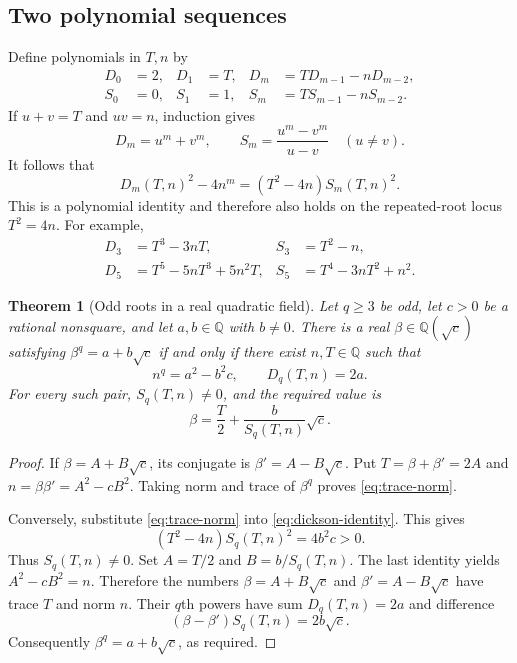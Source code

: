 \documentclass[11pt,letterpaper]{article}
\numberwithin{equation}{section}
\newtheorem{theorem}{Theorem}[section]
\theoremstyle{definition}\newtheorem{definition}[theorem]{Definition}
\theoremstyle{remark}\newtheorem{remark}[theorem]{Remark}
\newcommand{\Q}{\mathbb Q}\newcommand{\C}{\mathbb C}\newcommand{\R}{\mathbb R}\newcommand{\Z}{\mathbb Z}
\begin{document}
\subsection{Two polynomial sequences}
Define polynomials in $T,n$ by
\begin{align}
D_0&=2,&D_1&=T,&D_m&=T D_{m-1}-nD_{m-2},\\
S_0&=0,&S_1&=1,&S_m&=T S_{m-1}-nS_{m-2}.
\end{align}
If $u+v=T$ and $uv=n$, induction gives
\begin{equation}
D_m=u^m+v^m,\qquad
S_m=\frac{u^m-v^m}{u-v}\quad(u\ne v).
\end{equation}
It follows that
\begin{equation}
D_m(T,n)^2-4n^m=(T^2-4n)S_m(T,n)^2.
\label{eq:dickson-identity}
\end{equation}
This is a polynomial identity and therefore also holds on the repeated-root locus $T^2=4n$. For example,
\begin{align}
D_3&=T^3-3nT,&S_3&=T^2-n,\\
D_5&=T^5-5nT^3+5n^2T,&S_5&=T^4-3nT^2+n^2.
\end{align}

\begin{theorem}[Odd roots in a real quadratic field]
\label{thm:odd}
Let $q\ge3$ be odd, let $c>0$ be a rational nonsquare, and let $a,b\in\Q$ with $b\ne0$. There is a real $\beta\in\Q(\sqrt c)$ satisfying $\beta^q=a+b\sqrt c$ if and only if there exist $n,T\in\Q$ such that
\begin{equation}
n^q=a^2-b^2c,\qquad D_q(T,n)=2a.
\label{eq:trace-norm}
\end{equation}
For every such pair, $S_q(T,n)\ne0$, and the required value is
\begin{equation}
\beta=\frac T2+\frac{b}{S_q(T,n)}\sqrt c.
\label{eq:odd-reconstruction}
\end{equation}
\end{theorem}
\begin{proof}
If $\beta=A+B\sqrt c$, its conjugate is $\beta'=A-B\sqrt c$. Put $T=\beta+\beta'=2A$ and $n=\beta\beta'=A^2-cB^2$. Taking norm and trace of $\beta^q$ proves \eqref{eq:trace-norm}.

Conversely, substitute \eqref{eq:trace-norm} into \eqref{eq:dickson-identity}. This gives
\begin{equation}
(T^2-4n)S_q(T,n)^2=4b^2c>0.
\end{equation}
Thus $S_q(T,n)\ne0$. Set $A=T/2$ and $B=b/S_q(T,n)$. The last identity yields $A^2-cB^2=n$. Therefore the numbers $\beta=A+B\sqrt c$ and $\beta'=A-B\sqrt c$ have trace $T$ and norm $n$. Their $q$th powers have sum $D_q(T,n)=2a$ and difference
\[
(\beta-\beta')S_q(T,n)=2b\sqrt c.
\]
Consequently $\beta^q=a+b\sqrt c$, as required.
\end{proof}
\end{document}
